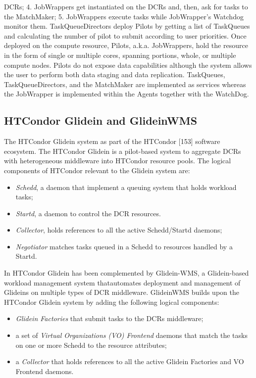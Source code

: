 DCRs; 4. JobWrappers get instantiated on the DCRs and, then,  ask for tasks to the MatchMaker; 5. JobWrappers execute tasks while JobWrapper’s Watchdog monitor them.
TaskQueueDirectors deploy Pilots by getting a list of TaskQueues and calculating the number of pilot to submit  according to user priorities.
Once deployed on the compute resource, Pilots, a.k.a. JobWrappers, hold the resource in the form of single or multiple cores, spanning portions, whole, or multiple compute nodes. Pilots do not expose data capabilities although the system allows the user to perform both data staging and data replication. 
TaskQueues, TaskQueueDirectors, and the MatchMaker are implemented as services whereas the JobWrapper is implemented within the Agents together with the WatchDog. 

\subsection{HTCondor Glidein and GlideinWMS}
The HTCondor Glidein system  as part of
the HTCondor [153] software ecosystem. The HTCondor
Glidein is a pilot-based system to aggregate DCRs with
heterogeneous middleware into HTCondor resource pools.
The logical components of HTCondor relevant to the
Glidein system are: 
\begin{itemize}
\item \emph{Schedd}, a daemon that implement a queuing system that holds workload tasks;
\item \emph{Startd}, a  daemon to control the DCR resources. 
\item \emph{Collector}, holds references to all the active
Schedd/Startd daemons; 
\item \emph{Negotiator} matches tasks queued in a Schedd to resources handled by a Startd.
\end{itemize}
In
HTCondor Glidein has been complemented by Glidein-WMS, a Glidein-based workload management system thatautomates deployment and management of Glideins on multiple types of DCR middleware. GlideinWMS builds upon the
HTCondor Glidein system by adding the following logical components: 
\begin{itemize}
\item \emph{Glidein Factories} that submit tasks to the DCRs middleware;
\item a set of \emph{Virtual Organizations (VO) Frontend} daemons that match the tasks on one or more Schedd to the resource attributes;
\item a \emph{Collector} that holds references to all the active Glidein Factories and VO Frontend daemons. 
\end{itemize}


